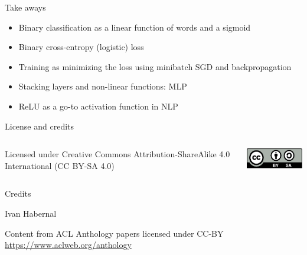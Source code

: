\documentclass[12pt,aspectratio=169,handout]{beamer}
\begin{document}
\begin{frame}{Take aways}
	
\begin{itemize}
	\item Binary classification as a linear function of words and a sigmoid
	\item Binary cross-entropy (logistic) loss
	\item Training as minimizing the loss using minibatch SGD and backpropagation
	\item Stacking layers and non-linear functions: MLP
	\item ReLU as a go-to activation function in NLP
\end{itemize}
	
\end{frame}



\begin{frame}{License and credits}

	\begin{columns}
		\begin{column}{0.7\textwidth}
			Licensed under Creative Commons Attribution-ShareAlike 4.0 International (CC BY-SA 4.0)
		\end{column}
		\begin{column}{0.2\textwidth}
			\includegraphics[width=0.9\linewidth]{img/cc-by-sa-icon.pdf}
		\end{column}
	\end{columns}
	
	\bigskip
	
	Credits
	
	\begin{scriptsize}
		
		Ivan Habernal
		
		Content from ACL Anthology papers licensed under CC-BY \url{https://www.aclweb.org/anthology}
		
	\end{scriptsize}
	
\end{frame}
\end{document}
